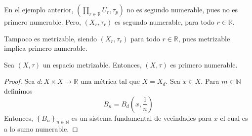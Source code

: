 \documentclass[12pt]{report}
\theoremstyle{largebreak}
\newcommand\cf[3]{\ensuremath{#1:#2\rightarrow#3}}
\begin{document}
    \begin{obs}
        En el ejemplo anterior, $\left(\prod_{ r\in\mathbb{R}}U_r,\tau_p \right)$ no es segundo numerable, pues no es primero numerable. Pero, $(X_r,\tau_r)$ es segundo numerable, para todo $r\in\mathbb{R}$.

        Tampoco es metrizable, siendo $(X_r,\tau_r)$ para todo $r\in\mathbb{R}$, pues metrizable implica primero numerable.
    \end{obs}

    \begin{propo}
        Sea $(X,\tau)$ un espacio metrizable. Entonces, $(X,\tau)$ es primero numerable.
    \end{propo}

    \begin{proof}
        Sea $\cf{d}{X\times X}{\mathbb{R}}$ una métrica tal que $X=X_d$. Sea $x\in X$. Para $m\in\mathbb{N}$ definimos
        \begin{equation*}
            B_n=B_d\left(x,\frac{1}{n}\right)
        \end{equation*}
        Entonces, $\left\{B_n\right\}_{ n\in\mathbb{N}}$ es un sistema fundamental de vecindades para $x$ el cual es a lo sumo numerable.
    \end{proof}

    \begin{exa}
        
    \end{exa}
\end{document}
